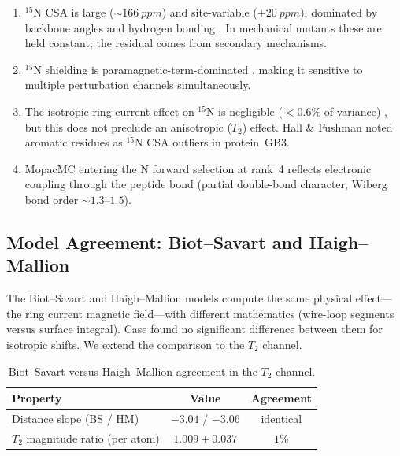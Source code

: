 \begin{enumerate}
  \item ${}^{15}$N CSA is large (${\sim}\SI{166}{ppm}$) and
    site-variable ($\pm\SI{20}{ppm}$), dominated by backbone angles and
    hydrogen bonding \cite{yao2010,hall2006}.  In mechanical mutants
    these are held constant; the residual comes from secondary
    mechanisms.

  \item ${}^{15}$N shielding is paramagnetic-term-dominated
    \cite{saito2010}, making it sensitive to multiple perturbation
    channels simultaneously.

  \item The isotropic ring current effect on ${}^{15}$N is negligible
    ($<0.6\%$ of variance) \cite{han2011}, but this does not preclude
    an anisotropic ($T_2$) effect.  Hall \& Fushman \cite{hall2006}
    noted aromatic residues as ${}^{15}$N CSA outliers in protein~GB3.

  \item MopacMC entering the N forward selection at rank~4 reflects
    electronic coupling through the peptide bond (partial double-bond
    character, Wiberg bond order ${\sim}1.3$--$1.5$).
\end{enumerate}


\subsection{Model Agreement: Biot--Savart and Haigh--Mallion}
\label{ssec:bs-hm}

The Biot--Savart \cite{johnson1958} and Haigh--Mallion
\cite{haighmallion1979} models compute the same physical effect---the
ring current magnetic field---with different mathematics (wire-loop
segments versus surface integral).  Case \cite{case1995} found no
significant difference between them for isotropic shifts.  We extend
the comparison to the $T_2$ channel.

\begin{table}[htbp]
  \centering
  \caption{Biot--Savart versus Haigh--Mallion agreement in the $T_2$
    channel.}
  \label{tab:bs-hm}
  \begin{tabular}{lcc}
    \toprule
    Property & Value & Agreement \\
    \midrule
    Distance slope (BS / HM) & $-3.04$ / $-3.06$ & identical \\
    $T_2$ magnitude ratio (per atom) & $1.009 \pm 0.037$ & $1\%$ \\
    \bottomrule
  \end{tabular}
\end{table}


